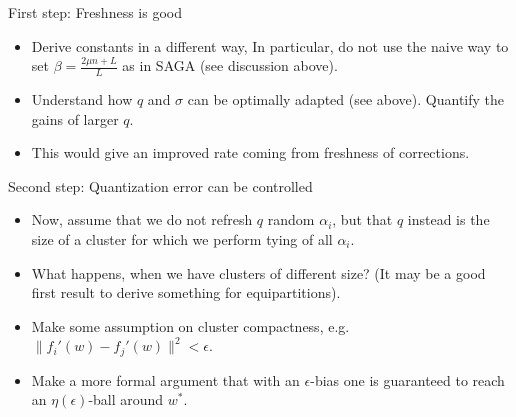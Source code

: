 \documentclass{article}
\begin{document}
First step: Freshness is good 
\begin{itemize}
\item Derive constants in a different way, In particular, do not use the naive way to set $\beta = \frac {2 \mu n + L }L$ as in SAGA (see discussion above).
\item Understand how $q$ and $\sigma$ can be optimally adapted (see above).  Quantify the gains of larger $q$.
\item This would give an improved rate coming from freshness of corrections. 
\end{itemize}

\noindent Second step: Quantization error can be controlled 
\begin{itemize}
\item Now, assume that we do not refresh $q$ random $\alpha_i$, but that $q$ instead is the size of a cluster for which we perform tying of all $\alpha_i$. 
\item What happens, when we have clusters of different size? (It may be a good first result to derive something for equipartitions). 
\item Make some assumption on cluster compactness, e.g.~$\| f_i'(w) - f_j'(w)\|^2 < \epsilon$. 
\item Make a more formal argument that with an $\epsilon$-bias one is guaranteed to reach an $\eta(\epsilon)$-ball around $w^*$. 
\end{itemize}
\end{document}
